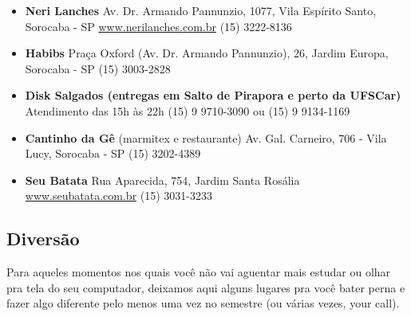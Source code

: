 \begin{multicols}{2}
  \begin{itemize}
    \item \textbf{Neri Lanches}
      \newline Av. Dr. Armando Pannunzio, 1077, Vila Espírito Santo, Sorocaba - SP
      \newline \url{www.nerilanches.com.br}
      \newline (15) 3222-8136
  \end{itemize}
  \begin{itemize}
    \item \textbf{Habibs}
      \newline Praça Oxford (Av. Dr. Armando Pannunzio), 26, Jardim Europa, Sorocaba - SP
      \newline (15) 3003-2828
  \end{itemize}
  \begin{itemize}
    \item \textbf{Disk Salgados (entregas em Salto de Pirapora e perto da UFSCar)}
      \newline Atendimento das 15h às 22h
      \newline(15) 9 9710-3090 ou (15) 9 9134-1169
  \end{itemize}
  \begin{itemize}
    \item \textbf{Cantinho da Gê} (marmitex e restaurante)
      \newline Av. Gal. Carneiro, 706 - Vila Lucy, Sorocaba - SP
      \newline (15) 3202-4389
  \end{itemize}
  \begin{itemize}
    \item \textbf{Seu Batata}
      \newline Rua Aparecida, 754, Jardim Santa Rosália
      \newline \url{www.seubatata.com.br}
      \newline (15) 3031-3233
  \end{itemize}
\end{multicols}

\subsection{Diversão}
Para aqueles momentos nos quais você não vai aguentar mais estudar ou olhar pra tela do seu computador, deixamos aqui alguns lugares pra você bater perna e fazer algo diferente pelo menos uma vez no semestre (ou várias vezes, your call).


